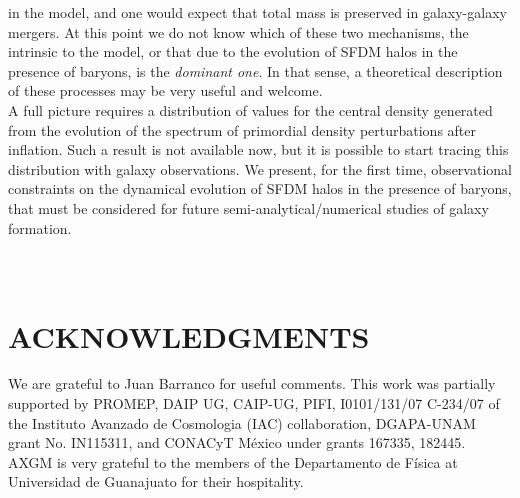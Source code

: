 \documentclass[letterpaper,10pt]{article}
\begin{document}
\begin{multicols}{2}
{in the model, and one would expect that total mass is preserved in galaxy-galaxy mergers. At this point we do not know which of these two mechanisms, the intrinsic to the model, or that due to the evolution of SFDM halos in the presence of baryons, is the \textit{dominant one}. In that sense, a theoretical description of these processes may be very useful and welcome.
\\
A full picture requires a distribution of values for the central density generated from the evolution of the spectrum of primordial density perturbations after inflation. Such a result is not available now, but it is possible to start tracing this distribution with galaxy observations. We present, for the first time, observational constraints
on the dynamical evolution of SFDM halos in the presence of baryons, that must be considered for future semi-analytical/numerical studies of galaxy formation.
\\\\\\
\section*{ACKNOWLEDGMENTS}
We are grateful to Juan Barranco for useful comments. This work was partially supported by PROMEP, DAIP UG, CAIP-UG, PIFI, I0101/131/07 C-234/07 of the Instituto Avanzado de Cosmologia (IAC) collaboration, DGAPA-UNAM grant No. IN115311, and CONACyT México under grants 167335, 182445. AXGM is very
grateful to the members of the Departamento de Física at Universidad de Guanajuato for their hospitality.
\\\\


}
\end{multicols}
\end{document}
